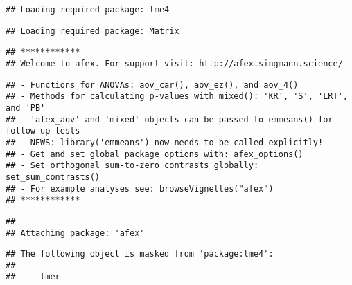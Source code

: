 \documentclass[]{article}
\title{}
\author{}
\date{}
\newenvironment{Shaded}{\begin{snugshade}}{\end{snugshade}}
\newcommand{\KeywordTok}[1]{\textcolor[rgb]{0.13,0.29,0.53}{\textbf{#1}}}
\newcommand{\DataTypeTok}[1]{\textcolor[rgb]{0.13,0.29,0.53}{#1}}
\newcommand{\DecValTok}[1]{\textcolor[rgb]{0.00,0.00,0.81}{#1}}
\newcommand{\StringTok}[1]{\textcolor[rgb]{0.31,0.60,0.02}{#1}}
\newcommand{\CommentTok}[1]{\textcolor[rgb]{0.56,0.35,0.01}{\textit{#1}}}
\newcommand{\OtherTok}[1]{\textcolor[rgb]{0.56,0.35,0.01}{#1}}
\newcommand{\OperatorTok}[1]{\textcolor[rgb]{0.81,0.36,0.00}{\textbf{#1}}}
\newcommand{\NormalTok}[1]{#1}
\begin{document}
\begin{Shaded}
\end{Shaded}

\begin{verbatim}
## Loading required package: lme4
\end{verbatim}

\begin{verbatim}
## Loading required package: Matrix
\end{verbatim}

\begin{verbatim}
## ************
## Welcome to afex. For support visit: http://afex.singmann.science/
\end{verbatim}

\begin{verbatim}
## - Functions for ANOVAs: aov_car(), aov_ez(), and aov_4()
## - Methods for calculating p-values with mixed(): 'KR', 'S', 'LRT', and 'PB'
## - 'afex_aov' and 'mixed' objects can be passed to emmeans() for follow-up tests
## - NEWS: library('emmeans') now needs to be called explicitly!
## - Get and set global package options with: afex_options()
## - Set orthogonal sum-to-zero contrasts globally: set_sum_contrasts()
## - For example analyses see: browseVignettes("afex")
## ************
\end{verbatim}

\begin{verbatim}
## 
## Attaching package: 'afex'
\end{verbatim}

\begin{verbatim}
## The following object is masked from 'package:lme4':
## 
##     lmer
\end{verbatim}
\end{document}
